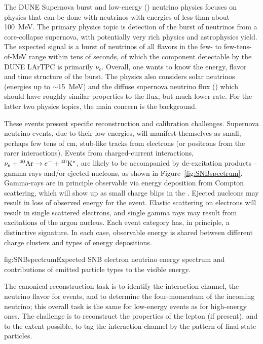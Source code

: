 The DUNE Supernova burst and low-energy () neutrino physics focuses on physics that can be done with neutrinos with energies of less than about \SI{100}{\MeV}.  The primary physics topic is detection of the burst of neutrinos from a core-collapse supernova, with potentially very rich physics and astrophysics yield.  The expected signal is a burst of neutrinos of all flavors in the few- to few-tens-of-\si{\MeV} range within tens of seconds, of which the component detectable by the DUNE LArTPC is primarily $\nu_e$.  Overall, one wants to know the energy, flavor and time structure of the burst. The  physics also considers solar neutrinos (energies up to $\sim$\SI{15}{\MeV}) and the diffuse supernova neutrino flux () which should have roughly similar properties to the  flux, but much lower rate. For the latter two physics topics, the main concern is the background. 

These events present specific reconstruction and calibration challenges. Supernova neutrino events, due to their low energies, will manifest themselves as small, perhaps few tens of \si{\cm}, stub-like tracks from electrons (or positrons from the rarer \anue interactions). Events from \nue charged-current interactions, $\nu_e+{}^{40}{\rm Ar}\rightarrow e^{-}+{}^{40}{\rm K}^{*}$, are likely to be accompanied by de-excitation products -- gamma rays and/or ejected nucleons, as shown in Figure~\ref{fig:SNBspectrum}. Gamma-rays are in principle observable via energy deposition from Compton scattering, which will show up as small charge blips in the . Ejected nucleons may result in loss of observed energy for the event. Elastic scattering on electrons will result in single
scattered electrons, and single gamma rays may result from  excitations of the argon nucleus.  Each event category has, in principle, a distinctive signature. In each case, observable energy is shared between different charge clusters and types of energy depositions.  

\begin{dunefigure}[]{fig:SNBspectrum}{Expected SNB electron neutrino energy spectrum
and contributions of emitted particle types to the visible
energy.}
\end{dunefigure}


The canonical reconstruction task is to identify the interaction channel, the neutrino flavor for  events, and to determine the four-momentum of the incoming neutrino; this overall task is the same for low-energy events as for high-energy ones.  The challenge is to reconstruct the properties of the lepton (if present), and to the extent possible, to tag the interaction channel by the pattern of final-state particles.

